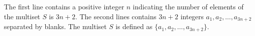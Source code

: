 The first line contains a positive integer $n$ indicating 
the number of elements of the multiset $S$ is $3n+2$.
The second lines contains $3n+2$ integers $a_1,a_2,\dots,a_{3n+2}$ 
separated by blanks.
The multiset $S$ is defined as $\{a_1,a_2,\dots,a_{3n+2}\}$.
